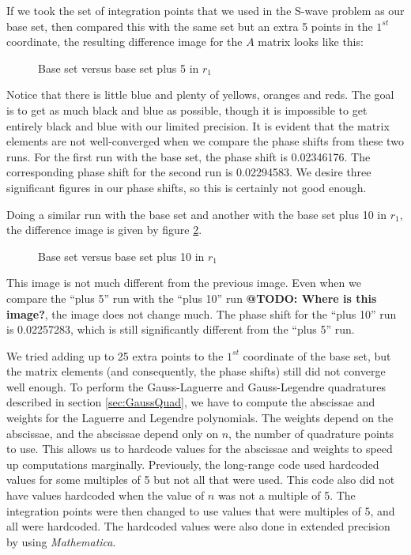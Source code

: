 \documentclass[Dissertation.tex]{subfiles}
\begin{document}
If we took the set of integration points that we used in the S-wave problem as our base set, then compared this with the same set but an extra 5 points in the $1^{st}$ coordinate, the resulting difference image for the $A$ matrix looks like this:
\begin{figure}
	\centering
	\caption{Base set versus base set plus 5 in $r_1$}
	\label{fig:BasevsBaseplus5}
\end{figure}
\noindent Notice that there is little blue and plenty of yellows, oranges and reds. The goal is to get as much black and blue as possible, though it is impossible to get entirely black and blue with our limited precision. It is evident that the matrix elements are not well-converged when we compare the phase shifts from these two runs. For the first run with the base set, the phase shift is 0.02346176. The corresponding phase shift for the second run is 0.02294583. We desire three significant figures in our phase shifts, so this is certainly not good enough.

Doing a similar run with the base set and another with the base set plus 10 in $r_1$, the difference image is given by figure \ref{fig:BasevsBaseplus10}.
\begin{figure}
	\centering
	\caption{Base set versus base set plus 10 in $r_1$}
	\label{fig:BasevsBaseplus10}
\end{figure}
\noindent This image is not much different from the previous image. Even when we compare the ``plus 5'' run with the ``plus 10'' run \textbf{@TODO: Where is this image?}, the image does not change much. The phase shift for the ``plus 10'' run is 0.02257283, which is still significantly different from the ``plus 5'' run.

We tried adding up to 25 extra points to the $1^{st}$ coordinate of the base set, but the matrix elements (and consequently, the phase shifts) still did not converge well enough. To perform the Gauss-Laguerre and Gauss-Legendre quadratures described in section \ref{sec:GaussQuad}, we have to compute the abscissae and weights for the Laguerre and Legendre polynomials. The weights depend on the abscissae, and the abscissae depend only on $n$, the number of quadrature points to use. This allows us to hardcode values for the abscissae and weights to speed up computations marginally. Previously, the long-range code used hardcoded values for some multiples of 5 but not all that were used. This code also did not have values hardcoded when the value of $n$ was not a multiple of 5. The integration points were then changed to use values that were multiples of 5, and all were hardcoded. The hardcoded values were also done in extended precision by using \emph{Mathematica}.
\end{document}

